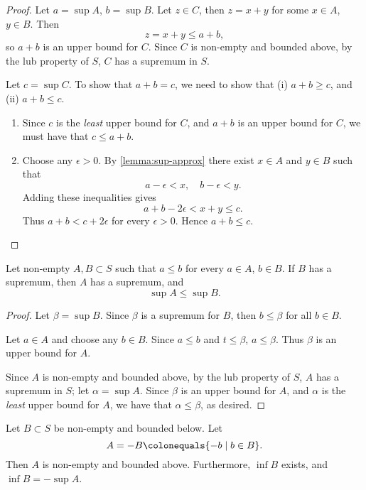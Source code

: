 \begin{proof}
Let $a=\sup A$, $b=\sup B$. Let $z\in C$, then $z=x+y$ for some $x\in A$, $y\in B$. Then
\[z=x+y\le a+b,\]
so $a+b$ is an upper bound for $C$. Since $C$ is non-empty and bounded above, by the lub property of $S$, $C$ has a supremum in $S$. 

Let $c=\sup C$. To show that $a+b=c$, we need to show that (i) $a+b\ge c$, and (ii) $a+b\le c$.
\begin{enumerate}[label=(\roman*)]
\item Since $c$ is the \emph{least} upper bound for $C$, and $a+b$ is an upper bound for $C$, we must have that $c\le a+b$.
\item Choose any $\epsilon>0$. By \ref{lemma:sup-approx} there exist $x\in A$ and $y\in B$ such that
\[a-\epsilon<x,\quad b-\epsilon<y.\]
Adding these inequalities gives
\[a+b-2\epsilon<x+y\le c.\]
Thus $a+b<c+2\epsilon$ for every $\epsilon>0$. Hence $a+b\le c$.
\end{enumerate}
\end{proof}

\begin{lemma}
Let non-empty $A,B\subset S$ such that $a\le b$ for every $a\in A$, $b\in B$. If $B$ has a supremum, then $A$ has a supremum, and
\[\sup A\le\sup B.\]
\end{lemma}

\begin{proof}
Let $\beta=\sup B$. Since $\beta$ is a supremum for $B$, then $b\le\beta$ for all $b\in B$.

Let $a\in A$ and choose any $b \in B$. Since $a \le b$ and $t \le \beta$, $a\le\beta$. Thus $\beta$ is an upper bound for $A$.

Since $A$ is non-empty and bounded above, by the lub property of $S$, $A$ has a supremum in $S$; let $\alpha=\sup A$. Since $\beta$ is an upper bound for $A$, and $\alpha$ is the \emph{least} upper bound for $A$, we have that $\alpha\le\beta$, as desired.
\end{proof}

\begin{lemma}\label{lemma:sup-inf-negative}
Let $B\subset S$ be non-empty and bounded below. Let
\[A=-B\colonequals\{-b\mid b\in B\}.\]
Then $A$ is non-empty and bounded above. Furthermore, $\inf B$ exists, and $\inf B=-\sup A$.
\end{lemma}

